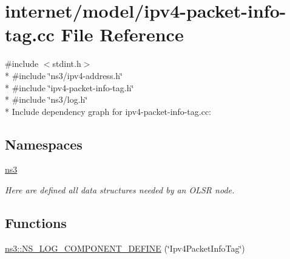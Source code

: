 \hypertarget{ipv4-packet-info-tag_8cc}{}\section{internet/model/ipv4-\/packet-\/info-\/tag.cc File Reference}
\label{ipv4-packet-info-tag_8cc}
{\ttfamily \#include $<$stdint.\+h$>$}\\*
{\ttfamily \#include \char`\"{}ns3/ipv4-\/address.\+h\char`\"{}}\\*
{\ttfamily \#include \char`\"{}ipv4-\/packet-\/info-\/tag.\+h\char`\"{}}\\*
{\ttfamily \#include \char`\"{}ns3/log.\+h\char`\"{}}\\*
Include dependency graph for ipv4-\/packet-\/info-\/tag.cc\+:
\subsection*{Namespaces}
\begin{DoxyCompactItemize}
\item 
 \hyperlink{namespacens3}{ns3}
\begin{DoxyCompactList}\small\item\em Here are defined all data structures needed by an O\+L\+SR node. \end{DoxyCompactList}\end{DoxyCompactItemize}
\subsection*{Functions}
\begin{DoxyCompactItemize}
\item 
\hyperlink{namespacens3_ae3a4be5fabc111b9983c0f18651e0be0}{ns3\+::\+N\+S\+\_\+\+L\+O\+G\+\_\+\+C\+O\+M\+P\+O\+N\+E\+N\+T\+\_\+\+D\+E\+F\+I\+NE} (\char`\"{}Ipv4\+Packet\+Info\+Tag\char`\"{})
\end{DoxyCompactItemize}
